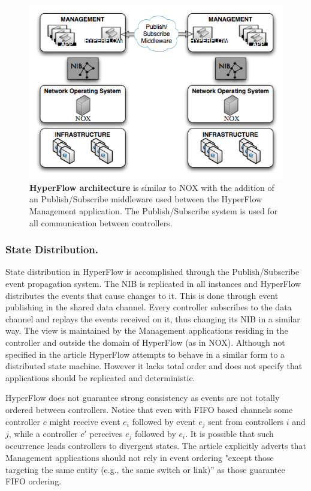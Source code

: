 \documentclass[12pt,openright,twoside]{report}
\begin{document}
\begin{itemize}
\begin{figure}
  \centering 
  \footnotesize
  \includegraphics[scale=0.5]{pic/hyperflow-design.png}
  \caption[HyperFlow architecture]{\textbf{HyperFlow architecture} is  similar to
    NOX  with the addition of an Publish/Subscribe middleware
    used between the HyperFlow Management application. The
    Publish/Subscribe system is used for all communication between controllers.}
  \label{fig:hyperflow-design}
\end{figure}


\subsubsection{State Distribution.} State distribution in HyperFlow is accomplished through the
Publish/Subscribe event propagation system. The NIB  is
replicated in all instances and HyperFlow distributes the events
that cause changes to it. This is done through event publishing in the shared
data channel. Every controller subscribes to the
data channel and replays the events received on it, thus changing its
NIB in a similar way.  The view  is maintained by the Management applications
residing in the controller and outside the domain of
HyperFlow (as in NOX). Although not specified in the article HyperFlow attempts to
behave in a similar form to a distributed state machine. However it
lacks total order and does not specify that applications should be
replicated and deterministic. 

HyperFlow does not guarantee strong
consistency as events are not totally ordered  between controllers. 
Notice that even with FIFO based channels some controller $c$ might receive event $e_i$ followed by event
$e_j$ sent from controllers $i$ and $j$, while a controller $c'$
perceives $e_j$ followed by $e_i$. It is possible that such occurrence
leads controllers to divergent states. The article explicitly adverts
that Management applications should not rely in event ordering "except
those targeting the same entity (e.g., the same switch or link)'' as
those guarantee FIFO ordering. 


\end{itemize}
\end{document}
